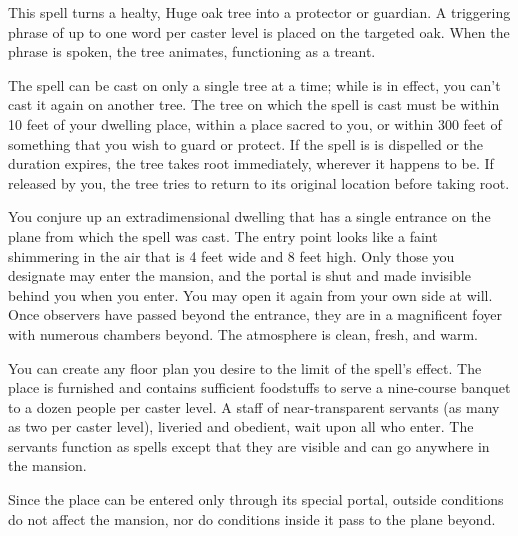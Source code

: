 \spelleffect This spell turns a healty, Huge oak tree into a protector or guardian. A triggering phrase of up to one word per caster level is placed on the targeted oak. When the phrase is spoken, the tree animates, functioning as a treant.
\par The spell can be cast on only a single tree at a time; while  is in effect, you can't cast it again on another tree. The tree on which the spell is cast must be within 10 feet of your dwelling place, within a place sacred to you, or within 300 feet of something that you wish to guard or protect.
\spellnotes If the spell is is dispelled or the duration expires, the tree takes root immediately, wherever it happens to be. If released by you, the tree tries to return to its original location before taking root.

\spelleffect 
{}
\spelleffect You conjure up an extradimensional dwelling that has a single entrance on the plane from which the spell was cast. The entry point looks like a faint shimmering in the air that is 4 feet wide and 8 feet high. Only those you designate may enter the mansion, and the portal is shut and made invisible behind you when you enter. You may open it again from your own side at will. Once observers have passed beyond the entrance, they are in a magnificent foyer with numerous chambers beyond. The atmosphere is clean, fresh, and warm.
\par You can create any floor plan you desire to the limit of the spell's effect. The place is furnished and contains sufficient foodstuffs to serve a nine-course banquet to a dozen people per caster level. A staff of near-transparent servants (as many as two per caster level), liveried and obedient, wait upon all who enter. The servants function as  spells except that they are visible and can go anywhere in the mansion.
\par Since the place can be entered only through its special portal, outside conditions do not affect the mansion, nor do conditions inside it pass to the plane beyond.

